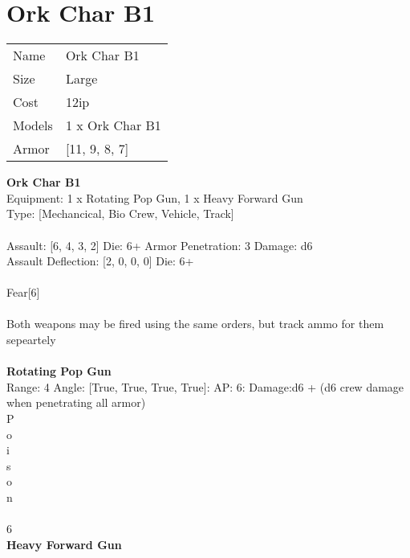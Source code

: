 \pagebreak

\section{ Ork Char B1 }

\begin{tabular}{ll}
  Name & Ork Char B1 \\
  Size & Large\\
  Cost & 12ip\\
  Models & 1 x Ork Char B1\\
  Armor & [11, 9, 8, 7]\\
\end{tabular}

\noindent 

{\bf Ork Char B1 } \\
Equipment: 1 x Rotating Pop Gun, 1 x Heavy Forward Gun \\
Type: [Mechancical, Bio Crew, Vehicle, Track] \\
\ \\
Assault: [6, 4, 3, 2] Die: 6+ Armor Penetration: 3 Damage: d6 \\
Assault Deflection: [2, 0, 0, 0] Die: 6+\\
\\ 
Fear[6]\\ 
 
\ \\
Both weapons may be fired using the same orders, but track ammo for them sepeartely\\ 

\ \\
{\bf Rotating Pop Gun } \\



Range: 4  Angle: [True, True, True, True]: AP: 6: Damage:d6 + (d6 crew damage when penetrating all armor) \\
P\\ 
o\\ 
i\\ 
s\\ 
o\\ 
n\\ 
 \\ 
6\\ 




{\bf Heavy Forward Gun } \\



